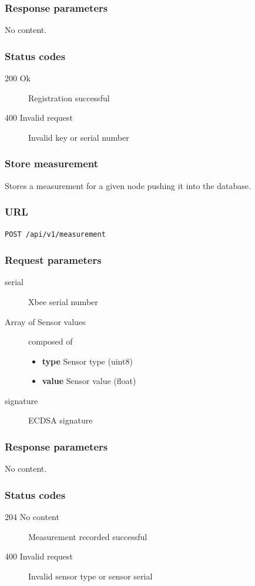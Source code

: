 \documentclass[a4paper,11pt]{scrartcl}
\begin{document}
\subsubsection*{Response parameters}
No content.

\subsubsection*{Status codes}
\begin{description}
\item[200 Ok] Registration successful
\item[400 Invalid request] Invalid key or serial number
\end{description}



\subsubsection{Store measurement}
Stores a measurement for a given node pushing it into the database.

\subsubsection*{URL}
\texttt{POST /api/v1/measurement}

\subsubsection*{Request parameters}
\begin{description}
\item[serial] Xbee serial number
\item[Array of Sensor values] composed of
\begin{itemize}
    \item \textbf{type} Sensor type (uint8)
    \item \textbf{value} Sensor value (float)
\end{itemize}
\item[signature] ECDSA signature
\end{description}

\subsubsection*{Response parameters}
No content.

\subsubsection*{Status codes}
\begin{description}
\item[204 No content] Measurement recorded successful
\item[400 Invalid request] Invalid sensor type or sensor serial
\end{description}
\end{document}
